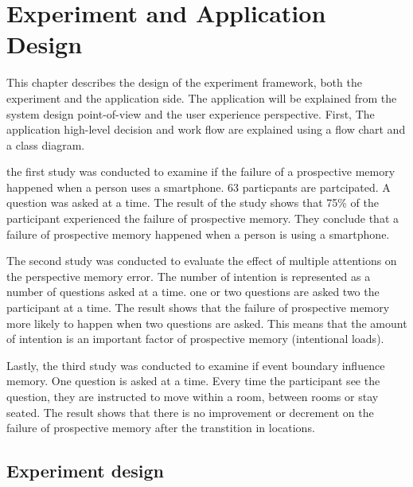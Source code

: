 \chapter{Experiment and Application Design}




This chapter describes the design of the experiment framework, both the experiment and the application side.
The application will be explained from the system design point-of-view and the user experience perspective. First,
The application high-level decision and work flow are explained using a flow chart and a class diagram.


the first study was conducted to examine if the failure of a prospective memory happened when a person uses a smartphone.
63 particpants are partcipated. A question was asked at a time.
The result of the study shows that 75\% of the participant experienced the failure of prospective memory.
They conclude that a failure of prospective memory happened when a person is using a smartphone.


The second study was conducted to evaluate the effect of multiple attentions on the perspective memory error.
The number of intention is represented as a number of questions asked at a time.
one or two questions are asked two the participant at a time.
The result shows that the failure of prospective memory more likely to
happen when two questions are asked. This means that the amount of intention is an important factor of prospective memory (intentional loads).

Lastly, the third study was conducted to examine if event boundary influence memory. One question is asked at a time.
Every time the participant see the question, they are instructed to move within a room, between rooms or stay seated.
The result shows that there is no improvement or decrement on the failure of prospective memory after the transtition in locations.


\section{Experiment design}
